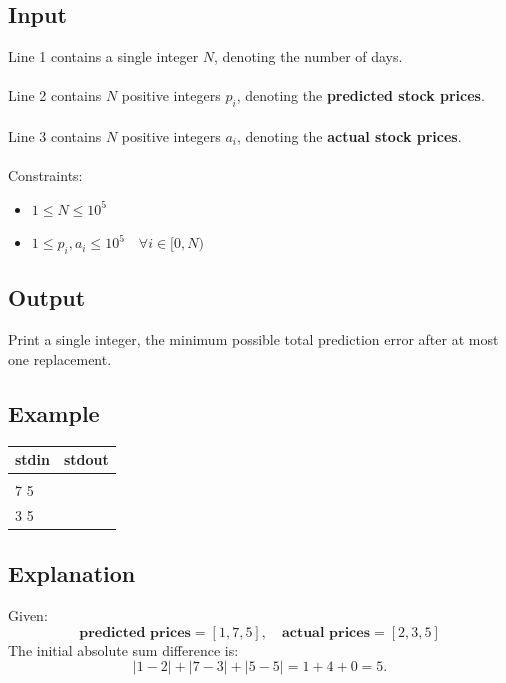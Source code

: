 \documentclass[12pt,a4paper]{article}
\begin{document}
\subsection*{\fontsize{16}{12}Input}
Line 1 contains a single integer $N$, denoting the number of days. \\\\
Line 2 contains $N$ positive integers $p_i$, denoting the \textbf{predicted stock prices}. \\\\
Line 3 contains $N$ positive integers $a_i$, denoting the \textbf{actual stock prices}.
\\\\
\noindent Constraints:
\begin{itemize}
    \item \( 1 \leq N \leq 10^5 \)
    \item \( 1 \leq p_i, a_i \leq 10^5\quad\forall i \in [0, N)\)
\end{itemize}

\subsection*{\fontsize{16}{12}Output}
Print a single integer, the minimum possible total prediction error after at most one replacement.

\subsection*{\fontsize{16}{12}Example}
\begin{table}[h]
  \centering
  \begin{tabularx}{\textwidth}{|>{\ttfamily}X|>{\ttfamily}X|}
  \hline
  stdin & stdout \\
  \hline
    3 & 3 \\
    1 7 5 & \\
    2 3 5 & \\  
  \hline
  \end{tabularx}
\end{table}

\subsection*{\fontsize{16}{12}Explanation}
Given:
\[
\textbf{predicted prices} = [1, 7, 5], \quad \textbf{actual prices} = [2, 3, 5]
\]
The initial absolute sum difference is:
\[
\left| 1 - 2 \right| + \left| 7 - 3 \right| + \left| 5 - 5 \right| = 1 + 4 + 0 = 5.
\]
\end{document}

